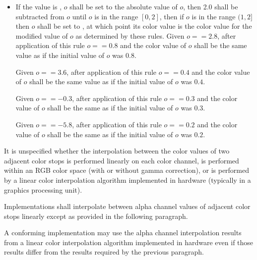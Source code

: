 \begin{enumeratea}
\begin{itemize}
	\item If the  value is , $o$ shall be set to the absolute value of $o$, then 2.0 shall be subtracted from $o$ until $o$ is in the range $[0,2]$, then if $o$ is in the range $(1,2]$ then $o$ shall be set to , at which point its color value is the color value for the modified value of $o$ as determined by these rules.
	\enterexample
	Given $o == 2.8$, after application of this rule $o == 0.8$ and the color value of $o$ shall be the same value as if the initial value of $o$ was $0.8$.
	
	Given $o == 3.6$, after application of this rule $o == 0.4$ and the color value of $o$ shall be the same value as if the initial value of $o$ was $0.4$.
	
	Given $o == -0.3$, after application of this rule $o == 0.3$ and the color value of $o$ shall be the same as if the initial value of $o$ was $0.3$.
	
	Given $o == -5.8$, after application of this rule $o == 0.2$ and the color value of $o$ shall be the same as if the initial value of $o$ was $0.2$.
	\exitexample
	\end{itemize}
\end{enumeratea}

\pnum
It is unspecified whether the interpolation between the color values of two adjacent color stops is performed linearly on each color channel, is performed within an RGB color space (with or without gamma correction), or is performed by a linear color interpolation algorithm implemented in hardware (typically in a graphics processing unit).

\pnum
Implementations shall interpolate between alpha channel values of adjacent color stops linearly except as provided in the following paragraph.

\pnum
A conforming implementation may use the alpha channel interpolation results from a linear color interpolation algorithm implemented in hardware even if those results differ from the results required by the previous paragraph.
